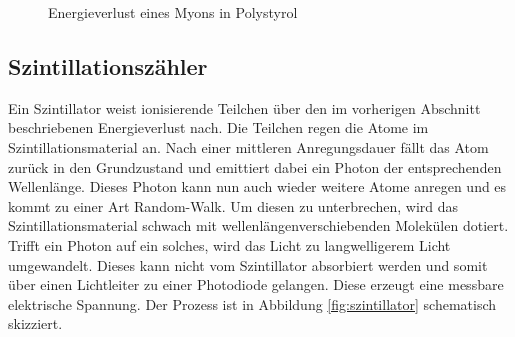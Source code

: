 \begin{figure}[h]
  \centering
  \caption{Energieverlust eines Myons in Polystyrol}
  \label{fig:landau}
\end{figure}

\subsection{Szintillationszähler}
Ein Szintillator weist ionisierende Teilchen über den im vorherigen Abschnitt beschriebenen Energieverlust nach. Die Teilchen regen die Atome im Szintillationsmaterial an. Nach einer mittleren Anregungsdauer fällt das Atom zurück in den Grundzustand und emittiert dabei ein Photon der entsprechenden Wellenlänge. Dieses Photon kann nun auch wieder weitere Atome anregen und es kommt zu einer Art Random-Walk. Um diesen zu unterbrechen, wird das Szintillationsmaterial schwach mit wellenlängenverschiebenden Molekülen dotiert. Trifft ein Photon auf ein solches, wird das Licht zu langwelligerem Licht umgewandelt. Dieses kann nicht vom Szintillator absorbiert werden und somit über einen Lichtleiter zu einer Photodiode gelangen. Diese erzeugt eine messbare elektrische Spannung. Der Prozess ist in Abbildung \ref{fig:szintillator} schematisch skizziert.

